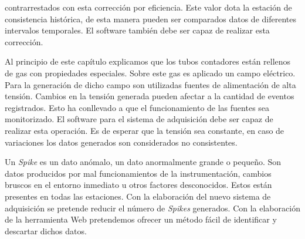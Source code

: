 	contrarrestados con esta corrección por eficiencia. Este valor dota la estación de consistencia histórica, de esta manera pueden ser
	comparados datos de diferentes intervalos temporales. El software también debe ser capaz de realizar esta corrección. 
	\par
	Al principio de este capítulo explicamos que los tubos contadores están rellenos de gas con propiedades especiales. Sobre este gas es aplicado
	un campo eléctrico. Para la generación de dicho campo son utilizadas fuentes de alimentación de alta tensión. Cambios en la tensión generada
	pueden afectar a la cantidad de eventos registrados. Esto ha conllevado a que el funcionamiento de las fuentes sea monitorizado. El software
	para el sistema de adquisición debe ser capaz de realizar esta operación. Es de esperar que la tensión sea constante, en caso de variaciones
	los datos generados son considerados no consistentes.
	\par
	Un \emph{Spike} es un dato anómalo, un dato anormalmente grande o pequeño. Son datos producidos por mal funcionamientos de la instrumentación,
	cambios bruscos en el entorno inmediato u otros factores desconocidos. Estos están presentes en todas las estaciones. Con la elaboración del
	nuevo sistema de adquisición se pretende reducir el número de \emph{Spikes} generados. Con la elaboración de la herramienta Web pretendemos
	ofrecer un método fácil de identificar y descartar dichos datos.
